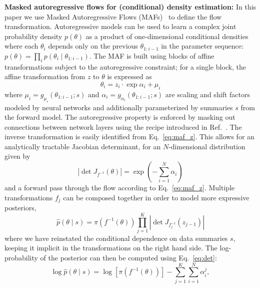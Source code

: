 \documentclass[prd,aps,10pt,nofootinbib,twocolumn,superscriptaddress,preprintnumbers,balancelastpage,longbibliography]{revtex4-1}
\begin{document}
\noindent
\textbf{Masked autoregressive flows for (conditional) density estimation:}
In this paper we use Masked Autoregressive Flows (MAFs)~\cite{10.5555/3294771.3294994} to define the flow transformation. Autoregressive models can be used to learn a complex joint probability density $p(\theta)$ as a product of one-dimensional conditional densities where each $\theta_i$ depends only on the previous $\theta_{1:i-1}$ in the parameter sequence: $p(\theta) = \prod_i p(\theta_i\mid \theta_{1:i-1})$. The MAF is built using blocks of affine transformations subject to the autoregressive constraint; for a single block, the affine transformation from $z$ to $\theta$ is expressed as %
\begin{equation}
\label{eq:maf_z}
\theta_{i}=z_{i}\cdot \exp \alpha_{i}+\mu_{i} 
\end{equation}
where $\mu_{i}=g_{\mu_{i}}\left({\theta}_{1: i-1} ; {s}\right)$ and $\alpha_i = g_{\alpha_{i}}\left({\theta}_{1: i-1} ; {s}\right)$ are scaling and shift factors modeled by neural networks and additionally parameterized by summaries $s$ from the forward model. The autoregressive property is enforced by masking out connections between network layers using the recipe introduced in Ref.~\cite{germain2015made}. The inverse transformation is easily identified from Eq.~\eqref{eq:maf_z}. This allows for an analytically tractable Jacobian determinant, for an $N$-dimensional distribution given by
\begin{equation}
\label{eq:det}
\left|\operatorname{det}J_{f^{-1}}(\theta)\right|=\exp \left(-\sum_{i=1}^N \alpha_{i}\right)
\end{equation}
and a forward pass through the flow according to Eq.~\eqref{eq:maf_z}.
Multiple transformations $f_j$ can be composed together in order to model more expressive posteriors,
\begin{equation}
\hat{p}({\theta}\mid s)=\pi\left(f^{-1}({\theta})\right) \prod_{j=1}^{K}\left|\operatorname{det}J_{f^{-1}_j}(z_{j-1})\right|
\end{equation}
where we have reinstated the conditional dependence on data summaries $s$, keeping it implicit in the transformations on the right hand side. The log-probability of the posterior can then be computed using Eq.~\eqref{eq:det}:
\begin{equation}
\label{eq:objective}
\log \hat{p}({\theta}\mid s) = \log \left[\pi\left(f^{-1}({\theta})\right)\right]-\sum_{j=1}^{K} \sum_{i=1}^{N} \alpha_{i}^{j},
\end{equation}
\end{document}

